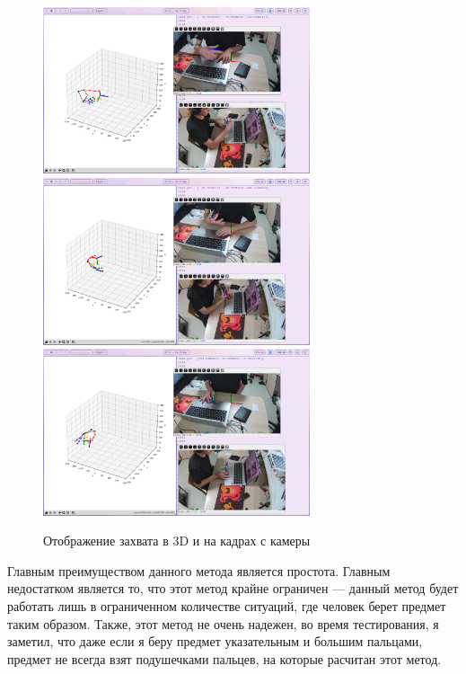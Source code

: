 \documentclass[12pt, a4paper]{article}
\begin{document}
\begin{figure}
  \begin{center}
    \includegraphics[width=0.7\textwidth]{images/gripper-conversion/gripper-conversion-1.png}\hfill
    \includegraphics[width=0.7\textwidth]{images/gripper-conversion/gripper-conversion-2.png}\hfill
    \includegraphics[width=0.7\textwidth]{images/gripper-conversion/gripper-conversion-3.png}\hfill
  \end{center}
  \caption{Отображение захвата в 3D и на кадрах с камеры}\label{fig:basic_gripper_work}
\end{figure}

Главным преимуществом данного метода является простота. Главным недостатком
является то, что этот метод крайне ограничен --- данный метод будет работать
лишь в ограниченном количестве ситуаций, где человек берет предмет таким
образом. Также, этот метод не очень надежен, во время тестирования, я заметил,
что даже если я беру предмет указательным и большим пальцами, предмет не всегда
взят подушечками пальцев, на которые расчитан этот метод.
\end{document}
